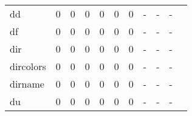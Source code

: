 \begin{longtable}{lp{1.2cm}p{1.2cm}p{1.2cm}p{1.2cm}p{1.2cm}p{1.2cm}p{1.2cm}p{1.2cm}p{1.2cm}p{1.2cm}}
dd        &                                     0 &                                                  0 &                                                  0 &                                                  0 &                                                  0 &                                                  0 &                                             - &                                                  - &                                                  - \\
df        &                                     0 &                                                  0 &                                                  0 &                                                  0 &                                                  0 &                                                  0 &                                             - &                                                  - &                                                  - \\
dir       &                                     0 &                                                  0 &                                                  0 &                                                  0 &                                                  0 &                                                  0 &                                             - &                                                  - &                                                  - \\
dircolors &                                     0 &                                                  0 &                                                  0 &                                                  0 &                                                  0 &                                                  0 &                                             - &                                                  - &                                                  - \\
dirname   &                                     0 &                                                  0 &                                                  0 &                                                  0 &                                                  0 &                                                  0 &                                             - &                                                  - &                                                  - \\
du        &                                     0 &                                                  0 &                                                  0 &                                                  0 &                                                  0 &                                                  0 &                                             - &                                                  - &                                                  - \\

\end{longtable}
